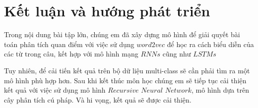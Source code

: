 \def\baselinestretch{1}
\chapter{Kết luận và hướng phát triển}
\ifpdf
    \graphicspath{{Conclusions/ConclusionsFigs/PNG/}{Conclusions/ConclusionsFigs/PDF/}{Conclusions/ConclusionsFigs/}}
\else
    \graphicspath{{Conclusions/ConclusionsFigs/EPS/}{Conclusions/ConclusionsFigs/}}
\fi

\def\baselinestretch{1.66}

Trong nội dung bài tập lớn, chúng em đã xây dựng mô hình để giải quyết bài toán phân tích quan điểm với việc sử dụng $word2vec$ để học ra cách biểu diễn của các từ trong câu, kết hợp với mô hình mạng $RNNs$ cũng như $LSTMs$

Tuy nhiên, để cải tiến kết quả trên bộ dữ liệu multi-class sẽ cần phải tìm ra một mô hình phù hợp hơn. Sau khi kết thúc môn học chúng em sẽ tiếp tục cải thiện kết quả với việc sử dụng mô hình $Recursive$ $Neural$ $Network$, mô hình dựa trên cây phân tích cú pháp. Và hi vọng, kết quả sẽ được cải thiện.


